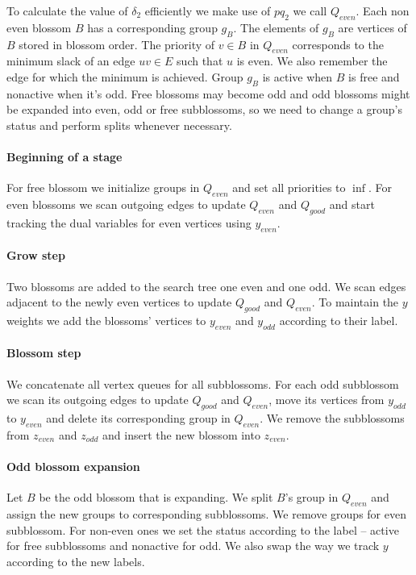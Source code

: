 To calculate the value of $\delta_2$ efficiently we make use of $pq_2$ we call $Q_{even}$. Each non even blossom $B$ has a corresponding group $g_B$. The elements of $g_B$ are vertices of $B$ stored in blossom order. The priority of $v \in B$ in $Q_{even}$ corresponds to the minimum slack of an edge $uv \in E$ such that $u$ is even. We also remember the edge for which the minimum is achieved. Group $g_B$ is active when $B$ is free and nonactive when it's odd. Free blossoms may become odd and odd blossoms might be expanded into even, odd or free subblossoms, so we need to change a group's status and perform splits whenever necessary.

\paragraph*{Beginning of a stage} For free blossom we initialize groups in $Q_{even}$ and set all priorities to $\inf$. For even blossoms we  scan outgoing edges to update $Q_{even}$ and $Q_{good}$ and start tracking the dual variables for even vertices using $y_{even}$.

\paragraph*{Grow step} Two blossoms are added to the search tree one even and one odd. We scan edges adjacent to the newly even vertices to update $Q_{good}$ and $Q_{even}$. To maintain the $y$ weights we add the blossoms' vertices to $y_{even}$ and $y_{odd}$ according to their label.

\paragraph*{Blossom step} We concatenate all vertex queues for all subblossoms. For each odd subblossom we scan its outgoing edges to update $Q_{good}$ and $Q_{even}$, move its vertices from $y_{odd}$ to $y_{even}$ and delete its corresponding group in $Q_{even}$. We remove the subblossoms from $z_{even}$ and $z_{odd}$ and insert the new blossom into $z_{even}$.

\paragraph*{Odd blossom expansion} Let $B$ be the odd blossom that is expanding. We split $B$'s group in $Q_{even}$ and assign the new groups to corresponding subblossoms. We remove groups for even subblossom. For non-even ones we set the status according to the label – active for free subblossoms and nonactive for odd. We also swap the way we track $y$ according to the new labels.

